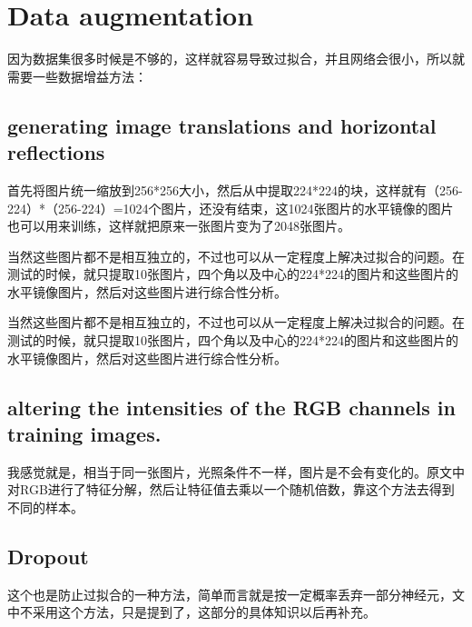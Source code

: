 \documentclass{article}
\begin{document}
\section{Data augmentation}
因为数据集很多时候是不够的，这样就容易导致过拟合，并且网络会很小，所以就需要一些数据增益方法：

\subsection{generating image translations and horizontal reflections}
首先将图片统一缩放到256*256大小，然后从中提取224*224的块，这样就有（256-224）*（256-224）=1024个图片，还没有结束，这1024张图片的水平镜像的图片也可以用来训练，这样就把原来一张图片变为了2048张图片。

当然这些图片都不是相互独立的，不过也可以从一定程度上解决过拟合的问题。在测试的时候，就只提取10张图片，四个角以及中心的224*224的图片和这些图片的水平镜像图片，然后对这些图片进行综合性分析。

当然这些图片都不是相互独立的，不过也可以从一定程度上解决过拟合的问题。在测试的时候，就只提取10张图片，四个角以及中心的224*224的图片和这些图片的水平镜像图片，然后对这些图片进行综合性分析。

\subsection{altering the intensities of the RGB channels in training images.}
我感觉就是，相当于同一张图片，光照条件不一样，图片是不会有变化的。原文中对RGB进行了特征分解，然后让特征值去乘以一个随机倍数，靠这个方法去得到不同的样本。

\subsection{Dropout}
这个也是防止过拟合的一种方法，简单而言就是按一定概率丢弃一部分神经元，文中不采用这个方法，只是提到了，这部分的具体知识以后再补充。
\end{document}
